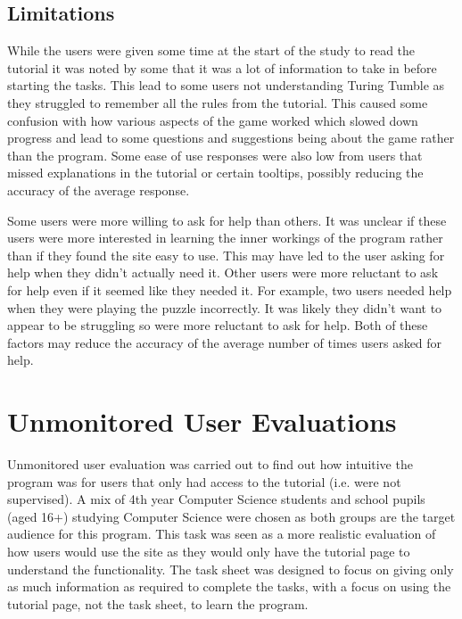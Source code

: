 \documentclass{l4proj}
\begin{document}
\subsection{Limitations}
While the users were given some time at the start of the study to read the tutorial it was noted by some that it was a lot of information to take in before starting the tasks. This lead to some users not understanding Turing Tumble as they struggled to remember all the rules from the tutorial. This caused some confusion with how various aspects of the game worked which slowed down progress and lead to some questions and suggestions being about the game rather than the program. Some ease of use responses were also low from users that missed explanations in the tutorial or certain tooltips, possibly reducing the accuracy of the average response.


Some users were more willing to ask for help than others. It was unclear if these users were more interested in learning the inner workings of the program rather than if they found the site easy to use. This may have led to the user asking for help when they didn't actually need it. Other users were more reluctant to ask for help even if it seemed like they needed it. For example, two users needed help when they were playing the puzzle incorrectly. It was likely they didn't want to appear to be struggling so were more reluctant to ask for help. Both of these factors may reduce the accuracy of the average number of times users asked for help.


\section{Unmonitored User Evaluations}
Unmonitored user evaluation was carried out to find out how intuitive the program was for users that only had access to the tutorial (i.e. were not supervised). A mix of 4th year Computer Science students and school pupils (aged 16+) studying Computer Science were chosen as both groups are the target audience for this program. This task was seen as a more realistic evaluation of how users would use the site as they would only have the tutorial page to understand the functionality. The task sheet was designed to focus on giving only as much information as required to complete the tasks, with a focus on using the tutorial page, not the task sheet, to learn the program. 
\end{document}
